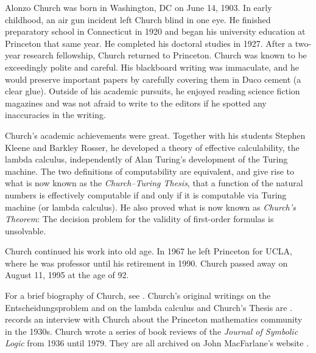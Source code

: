 \documentclass[../../../include/open-logic-section]{subfiles}
\begin{document}



Alonzo Church was born in Washington, DC on June 14, 1903.  In early
childhood, an air gun incident left Church blind in one eye. He
finished preparatory school in Connecticut in 1920 and began his
university education at Princeton that same year. He completed his
doctoral studies in 1927. After a two-year research fellowship, Church returned
to Princeton. Church was known to be exceedingly polite and careful. His
blackboard writing was immaculate, and he would preserve important
papers by carefully covering them in Duco cement (a clear
glue). Outside of his academic pursuits, he enjoyed reading science
fiction magazines and was not afraid to write to the editors if he
spotted any inaccuracies in the writing.

Church's academic achievements were great.  Together with his students
Stephen Kleene and Barkley Rosser, he developed a theory of effective
calculability, the lambda calculus, independently of Alan Turing's
development of the Turing machine. The two definitions of
computability are equivalent, and give rise to what is now known as
the \emph{Church--Turing Thesis}, that a function of the natural
numbers is effectively computable if and only if it is computable via
Turing machine (or lambda calculus). He also proved what is now known
as \emph{Church's Theorem}: The decision problem for the validity of
first-order formulas is unsolvable.

Church continued his work into old age. In 1967 he left Princeton for
UCLA, where he was professor until his retirement in 1990. Church
passed away on August 11, 1995 at the age of 92.

\begin{reading} 
For a brief biography of Church, see \citet{EndertonND}.  Church's
original writings on the Entscheidungsproblem and on the lambda calculus
and Church's Thesis are \citet{Church1936,Church1936a}.
\citet{Aspray1984} records an interview with Church about the
Princeton mathematics community in the 1930s.
Church wrote a series of book reviews of the \emph{Journal of
Symbolic Logic} from 1936 until 1979. They are all archived on John
MacFarlane's website \citep{MacFarlane2015}.
\end{reading} 
\end{document}
